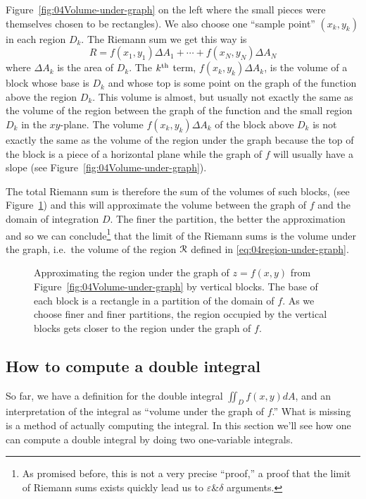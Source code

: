 Figure~\ref{fig:04Volume-under-graph} on the left where the small pieces were
themselves chosen to be rectangles).  We also choose one ``sample point'' $(x_k,
y_k)$ in each region $D_k$.  The Riemann sum we get this way is
\[
R = f(x_1, y_1) \Delta A_1 + \cdots + f(x_N, y_N) \Delta A_N
\]
where $\Delta A_k$ is the area of $D_k$.  The $k^{\rm th}$ term, $f(x_k, y_k)
\Delta A_k$, is the volume of a block whose base is $D_k$ and whose top is some
point on the graph of the function above the region $D_k$.  This volume is
almost, but usually not exactly the same as the volume of the region between the
graph of the function and the small region $D_k$ in the $xy$-plane.  The volume
$f(x_k, y_k)\Delta A_k$ of the block above $D_k$ is not exactly the same as the
volume of the region under the graph because the top of the block is a piece of
a horizontal plane while the graph of $f$ will usually have a slope (see
Figure~\ref{fig:04Volume-under-graph}).

The total Riemann sum is therefore the sum of the volumes of such blocks, (see
Figure~\ref{fig:04Riemannsums-for-double-int}) and this will approximate the
volume between the graph of $f$ and the domain of integration $D$.  The finer
the partition, the better the approximation and so we can conclude\footnote{As
  promised before, this is not a very precise ``proof,'' a proof that the limit
  of Riemann sums exists quickly lead us to $\varepsilon$\&$\delta$ arguments.}
that the limit of the Riemann sums is the volume under the graph, i.e.~the
volume of the region $\mathcal{R}$ defined in \eqref{eq:04region-under-graph}.

\begin{figure}[t]\centering
  
  
  \caption{Approximating the region under the graph of $z=f(x, y)$ from
    Figure~\ref{fig:04Volume-under-graph} by vertical blocks.  The base of each
    block is a rectangle in a partition of the domain of $f$.  As we choose
    finer and finer partitions, the region occupied by the vertical blocks gets
    closer to the region under the graph of $f$.}
  \label{fig:04Riemannsums-for-double-int}
\end{figure}


\subsection{How to compute a double integral}  
\label{sec:how-to-compute-a-double-integral}%
So far, we have a definition for the double integral $\iint_D f(x, y) dA $, and
an interpretation of the integral as ``volume under the graph of $f$.''  What is
missing is a method of actually computing the integral.  In this section we'll
see how one can compute a double integral by doing two one-variable integrals.

